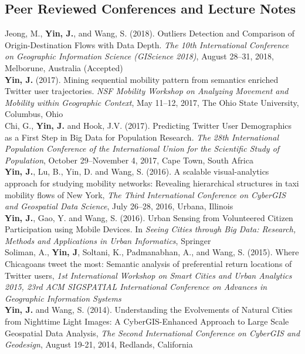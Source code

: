 \documentclass[11pt, a4paper]{article}
\newcommand{\years}[1]{\marginnote{\scriptsize #1}}
\begin{document}
\subsection*{Peer Reviewed Conferences and Lecture Notes}
\noindent
\years{2018}Jeong, M., \textbf{Yin, J.}, and Wang, S. (2018). Outliers Detection and Comparison of Origin-Destination Flows with Data Depth. \textit{The 10th International Conference on Geographic Information Science (GIScience 2018)}, August 28–31, 2018, Melborune, Australia (Accepted)\\
\years{2017}\textbf{Yin, J.} (2017). Mining sequential mobility pattern from semantics enriched Twitter user trajectories. \textit{NSF Mobility Workshop on Analyzing Movement and Mobility within Geographic Context}, May 11–12, 2017, The Ohio State University, Columbus, Ohio\\
\years{2017}Chi, G., \textbf{Yin, J.} and Hook, J.V. (2017). Predicting Twitter User Demographics as a First Step in Big Data for Population Research. \textit{The 28th International Population Conference of the International Union for the Scientific Study of Population}, October 29–November 4, 2017, Cape Town, South Africa\\
\years{2016}\textbf{Yin, J.}, Lu, B., Yin, D. and Wang, S. (2016). A scalable visual-analytics approach for studying mobility networks: Revealing hierarchical structures in taxi mobility flows of New York, \textit{The Third International Conference on CyberGIS and Geospatial Data Science}, July 26–28, 2016, Urbana, Illinois\\
\years{2016}\textbf{Yin, J.}, Gao, Y. and Wang, S. (2016). Urban Sensing from Volunteered Citizen Participation using Mobile Devices. In \emph{Seeing Cities through Big Data: Research, Methods and Applications in Urban Informatics}, Springer\\
\years{2015}Soliman, A., \textbf{Yin, J}, Soltani, K., Padmanabhan, A., and Wang, S. (2015). Where Chicagoans tweet the most: Semantic analysis of preferential return locations of Twitter users, \textit{1st International Workshop on Smart Cities and Urban Analytics 2015, 23rd ACM SIGSPATIAL International Conference on Advances in Geographic Information Systems}\\ 
\years{2014}\textbf{Yin, J.} and Wang, S. (2014). Understanding the Evolvements of Natural Cities from Nighttime Light Images: A CyberGIS-Enhanced Approach to Large Scale Geospatial Data Analysis, \textit{The Second International Conference on CyberGIS and Geodesign}, August 19-21, 2014, Redlands, California\\
\end{document}
